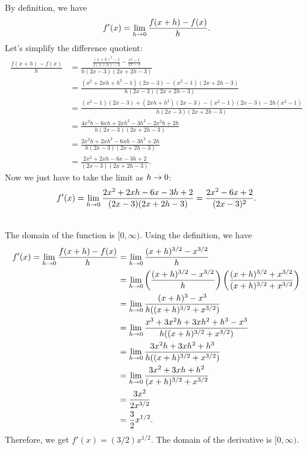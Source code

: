 	\\
	By definition, we have 
		\begin{align*}
		f'(x) = \lim_{h \rightarrow 0} \frac{f(x + h) - f(x)}{h} .
		\end{align*}
	Let's simplify the difference quotient:
		\begin{align*}
		\frac{f(x + h) - f(x)}{h} &= \frac{\frac{(x + h)^2 - 1}{2 (x + h) - 3} - \frac{x^2-1}{2x - 3}}{h (2x-3)(2x + 2h - 3)} \\
		&= \frac{(x^2 + 2xh + h^2 - 1)(2x - 3) - (x^2 - 1)(2x + 2h - 3)}{h (2x-3)(2x + 2h - 3)} \\
		&= \frac{(x^2 - 1) (2x - 3) + (2xh + h^2) (2x - 3) - (x^2 - 1) (2x - 3) - 2h (x^2 - 1)}{h (2x-3)(2x + 2h - 3)} \\
		&= \frac{4x^2 h - 6xh + 2xh^2 - 3h^2 - 2x^2h + 2h}{h (2x-3)(2x + 2h - 3)} \\
		&= \frac{2x^2 h + 2xh^2 - 6xh - 3h^2 + 2h}{h (2x-3)(2x + 2h - 3)} \\
		&= \frac{2x^2 + 2xh - 6x - 3h + 2}{(2x-3)(2x + 2h - 3)} .
		\end{align*}
	Now we just have to take the limit as $h \rightarrow 0$:
		\begin{align*}
		f'(x) = \lim_{h \rightarrow 0} \frac{2x^2 + 2xh - 6x - 3h + 2}{(2x-3)(2x + 2h - 3)} = \frac{2x^2 -6x + 2}{(2x - 3)^2} .
		\end{align*}
	
	\spc
	
	\\
	The domain of the function is $[0, \infty )$.
	Using the definition, we have
		\begin{align*}
		f'(x) = \lim_{h \rightarrow 0} \frac{f (x + h) - f(x)}{h} & = \lim_{h \rightarrow 0} \frac{(x +h)^{3/2} - x^{3/2}}{h} \\
		&= \lim_{h \rightarrow 0} \left( \frac{(x +h)^{3/2} - x^{3/2}}{h} \right) \left( \frac{(x + h)^{3/2} + x^{3/2}}{(x + h)^{3/2} + x^{3/2}} \right) \\
		&= \lim_{h \rightarrow 0} \frac{(x + h)^3 - x^3}{h ((x + h)^{3/2} + x^{3/2})} \\
		&= \lim_{h \rightarrow 0} \frac{x^3 + 3x^2 h + 3xh^2 + h^3 - x^3}{h ((x + h)^{3/2} + x^{3/2})} \\
		&= \lim_{h \rightarrow 0} \frac{3x^2 h + 3xh^2 + h^3}{h ((x + h)^{3/2} + x^{3/2})} \\
		&= \lim_{h \rightarrow 0} \frac{3x^2 + 3xh + h^2}{(x + h)^{3/2} + x^{3/2}} \\
		&= \frac{3x^2}{2x^{3/2}} \\
		&= \frac{3}{2} x^{1/2} .
		\end{align*}
	Therefore, we get $f' (x) = (3/2)x^{1/2}$. The domain of the derivative is $[0, \infty )$.
	
